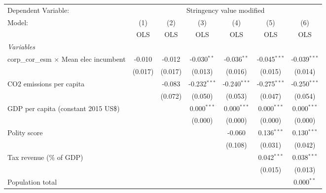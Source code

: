 
\begingroup
\centering
\begin{tabular}{lcccccc}
   \toprule
   Dependent Variable: & \multicolumn{6}{c}{Stringency value modified}\\
   Model:                                         & (1)     & (2)     & (3)            & (4)            & (5)            & (6)\\  
                                                  &  OLS    & OLS     & OLS            & OLS            & OLS            & OLS\\  
   \midrule
   \emph{Variables}\\
   corp\_cor\_esm $\times$ Mean elec incumbent    & -0.010  & -0.012  & -0.030$^{**}$  & -0.036$^{**}$  & -0.045$^{***}$ & -0.039$^{***}$\\   
                                                  & (0.017) & (0.017) & (0.013)        & (0.016)        & (0.015)        & (0.014)\\   
   CO2 emissions per capita                       &         & -0.083  & -0.232$^{***}$ & -0.240$^{***}$ & -0.275$^{***}$ & -0.250$^{***}$\\   
                                                  &         & (0.072) & (0.050)        & (0.053)        & (0.047)        & (0.054)\\   
   GDP per capita (constant 2015 US\$)            &         &         & 0.000$^{***}$  & 0.000$^{***}$  & 0.000$^{***}$  & 0.000$^{***}$\\   
                                                  &         &         & (0.000)        & (0.000)        & (0.000)        & (0.000)\\   
   Polity score                                   &         &         &                & -0.060         & 0.136$^{***}$  & 0.130$^{***}$\\   
                                                  &         &         &                & (0.108)        & (0.031)        & (0.042)\\   
   Tax revenue (\% of GDP)                        &         &         &                &                & 0.042$^{***}$  & 0.038$^{***}$\\   
                                                  &         &         &                &                & (0.015)        & (0.013)\\   
   Population total                               &         &         &                &                &                & 0.000$^{**}$\\   

\end{tabular}
